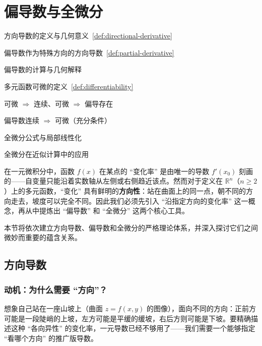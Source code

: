 \documentclass[lang=cn,11pt]{elegantbook}
\begin{document}

\section{偏导数与全微分}

\begin{introduction}
  \item 方向导数的定义与几何意义~\ref{def:directional-derivative}
  \item 偏导数作为特殊方向的方向导数~\ref{def:partial-derivative}
  \item 偏导数的计算与几何解释
  \item 多元函数可微的定义~\ref{def:differentiability}
  \item 可微 $\Rightarrow$ 连续、可微 $\Rightarrow$ 偏导存在
  \item 偏导数连续 $\Rightarrow$ 可微（充分条件）
  \item 全微分公式与局部线性化~
  \item 全微分在近似计算中的应用
\end{introduction}

在一元微积分中，函数 $f(x)$ 在某点的 ``变化率'' 是由唯一的导数 $f'(x_0)$ 刻画的——自变量只能沿着实数轴从左侧或右侧趋近该点。然而对于定义在 $\mathbb R^n$（$n\geq 2$）上的多元函数，``变化'' 具有鲜明的\textbf{方向性}：站在曲面上的同一点，朝不同的方向走去，坡度可以完全不同。因此我们必须先引入 ``沿指定方向的变化率'' 这一概念，再从中提炼出 ``偏导数'' 和 ``全微分'' 这两个核心工具。

本节将依次建立方向导数、偏导数和全微分的严格理论体系，并深入探讨它们之间微妙而重要的蕴含关系。


\subsection{方向导数}

\subsubsection*{动机：为什么需要 ``方向''？}

想象自己站在一座山坡上（曲面 $z=f(x,y)$ 的图像），面向不同的方向：正前方可能是一段陡峭的上坡，左方可能是平缓的缓坡，右后方则可能是下坡。要精确描述这种 ``各向异性'' 的变化率，一元导数已经不够用了——我们需要一个能够指定 ``看哪个方向'' 的推广版导数。
\end{document}
